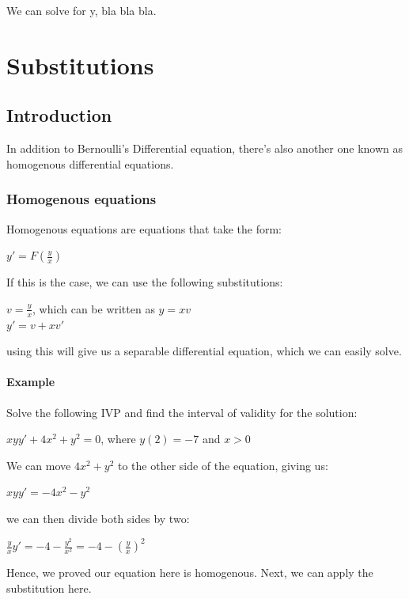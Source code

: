 \documentclass{article}
\begin{document}
We can solve for y, bla bla bla. 

\section{Substitutions}
\subsection{Introduction}

In addition to Bernoulli's Differential equation, there's also another one known as homogenous differential equations.
\subsubsection{Homogenous equations}

Homogenous equations are equations that take the form:

\begin{center}
    $y' = F(\frac{y}{x})$
\end{center}

If this is the case, we can use the following substitutions:

\begin{center}
    $v = \frac{y}{x}$, which can be written as $y = xv$\\
    $y' = v + xv'$
\end{center}

using this will give us a separable differential equation, which we can easily solve. 

\paragraph{Example}

Solve the following IVP and find the interval of validity for the solution:

\begin{center}
    $xyy' + 4x^2 + y^2 = 0$, where $y(2) = -7$ and $x > 0$
\end{center}

We can move $4x^2 + y^2$ to the other side of the equation, giving us:

\begin{center}
    $xyy' = -4x^2 - y^2$
\end{center}

we can then divide both sides by two:

\begin{center}
    $\frac{y}{x} y' = -4 - \frac{y^2}{x^2} = -4 - (\frac{y}{x})^2$
\end{center}
Hence, we proved our equation here is homogenous.  Next, we can apply the substitution here.
\end{document}
